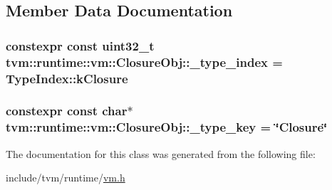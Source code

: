\subsection{Member Data Documentation}
\subsubsection[{\texorpdfstring{\+\_\+type\+\_\+index}{_type_index}}]{\setlength{\rightskip}{0pt plus 5cm}constexpr const uint32\+\_\+t tvm\+::runtime\+::vm\+::\+Closure\+Obj\+::\+\_\+type\+\_\+index = Type\+Index\+::k\+Closure\hspace{0.3cm}{\ttfamily [static]}}\hypertarget{classtvm_1_1runtime_1_1vm_1_1ClosureObj_ad7b69fbf85ebd1370aa6c000468131aa}{}\label{classtvm_1_1runtime_1_1vm_1_1ClosureObj_ad7b69fbf85ebd1370aa6c000468131aa}
\subsubsection[{\texorpdfstring{\+\_\+type\+\_\+key}{_type_key}}]{\setlength{\rightskip}{0pt plus 5cm}constexpr const char$\ast$ tvm\+::runtime\+::vm\+::\+Closure\+Obj\+::\+\_\+type\+\_\+key = \char`\"{}Closure\char`\"{}\hspace{0.3cm}{\ttfamily [static]}}\hypertarget{classtvm_1_1runtime_1_1vm_1_1ClosureObj_a2d48c3192358b0be23ba9fadbe7345a0}{}\label{classtvm_1_1runtime_1_1vm_1_1ClosureObj_a2d48c3192358b0be23ba9fadbe7345a0}


The documentation for this class was generated from the following file\+:\begin{DoxyCompactItemize}
\item 
include/tvm/runtime/\hyperlink{vm_8h}{vm.\+h}\end{DoxyCompactItemize}
